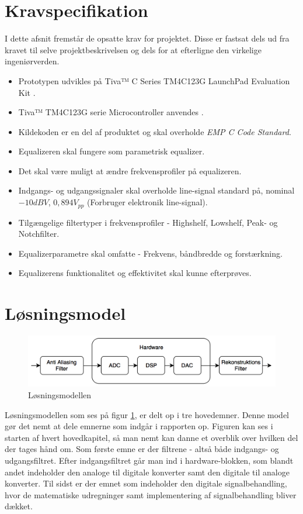\section{Kravspecifikation} \label{afs:kravspecifikation}
I dette afsnit fremstår de opsatte krav for projektet.
Disse er fastsat dels ud fra kravet til selve projektbeskrivelsen og dels for at efterligne den virkelige ingeniørverden.

\begin{itemize}[noitemsep]
	\item Prototypen udvikles på Tiva™ C Series TM4C123G LaunchPad Evaluation Kit \cite{spmt281a}.
	\item Tiva™ TM4C123G serie Microcontroller anvendes \cite{spmu296}.
	\item Kildekoden er en del af produktet og skal overholde \textit{EMP C Code Standard}\cite{emp-c}.
	\item Equalizeren skal fungere som parametrisk equalizer.
	\item Det skal være muligt at ændre frekvensprofiler på equalizeren.
	\item Indgangs- og udgangssignaler skal overholde line-signal standard på, nominal $-10 dBV$, $0,894 V_{pp}$ (Forbruger elektronik line-signal).
	\item Tilgængelige filtertyper i frekvensprofiler - Highshelf, Lowshelf, Peak- og Notchfilter.
	\item Equalizerparametre skal omfatte - Frekvens, båndbredde og forstærkning.
	\item Equalizerens funktionalitet og effektivitet skal kunne efterprøves.
\end{itemize}


\section{Løsningsmodel}

\begin{figure}[h]
	\centering
	\includegraphics[width=0.8\linewidth]{billeder/flow_losn}
	\caption{Løsningsmodellen}
	\label{fig:losningsmodel}
\end{figure}

Løsningsmodellen som ses på figur \ref{fig:losningsmodel}, er delt op i tre hovedemner. Denne model gør det nemt at dele emnerne som indgår i rapporten op. Figuren kan ses i starten af hvert hovedkapitel, så man nemt kan danne et overblik over hvilken del der tages hånd om. Som første emne er der filtrene - altså både indgangs- og udgangsfiltret. Efter indgangsfiltret går man ind i hardware-blokken, som blandt andet indeholder den analoge til digitale konverter samt den digitale til analoge konverter. Til sidst er der emnet som indeholder den digitale signalbehandling, hvor de matematiske udregninger samt implementering af signalbehandling bliver dækket. 


